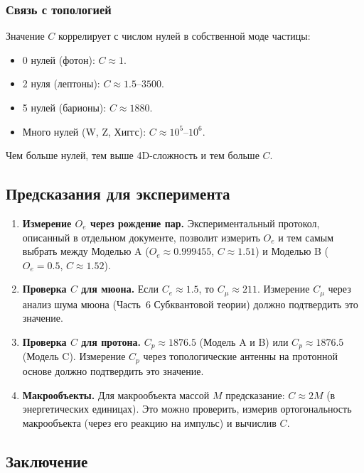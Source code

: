 \documentclass[12pt,a4paper]{article}
\begin{document}
\subsubsection{Связь с топологией}

Значение $C$ коррелирует с числом нулей в собственной моде частицы:

\begin{itemize}
    \item 0 нулей (фотон): $C \approx 1$.
    \item 2 нуля (лептоны): $C \approx 1.5$--$3500$.
    \item 5 нулей (барионы): $C \approx 1880$.
    \item Много нулей (W, Z, Хиггс): $C \approx 10^5$--$10^6$.
\end{itemize}

Чем больше нулей, тем выше 4D-сложность и тем больше $C$.

\subsection{Предсказания для эксперимента}

\begin{enumerate}[label=\arabic*.]
    \item \textbf{Измерение $O_e$ через рождение пар.} Экспериментальный протокол, описанный в отдельном документе, позволит измерить $O_e$ и тем самым выбрать между Моделью A ($O_e \approx 0.999455$, $C \approx 1.51$) и Моделью B ($O_e = 0.5$, $C \approx 1.52$).
    \item \textbf{Проверка $C$ для мюона.} Если $C_e \approx 1.5$, то $C_\mu \approx 211$. Измерение $C_\mu$ через анализ шума мюона (Часть~6 Субквантовой теории) должно подтвердить это значение.
    \item \textbf{Проверка $C$ для протона.} $C_p \approx 1876.5$ (Модель A и B) или $C_p \approx 1876.5$ (Модель C). Измерение $C_p$ через топологические антенны на протонной основе должно подтвердить это значение.
    \item \textbf{Макрообъекты.} Для макрообъекта массой $M$ предсказание: $C \approx 2M$ (в энергетических единицах). Это можно проверить, измерив ортогональность макрообъекта (через его реакцию на импульс) и вычислив $C$.
\end{enumerate}

\subsection{Заключение}
\end{document}
